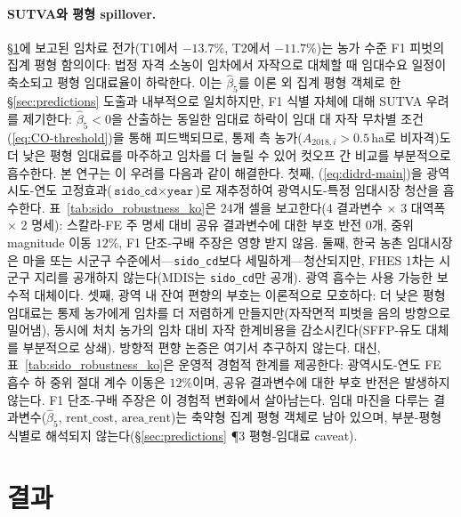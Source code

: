 \documentclass[12pt, a4paper]{article}
\begin{document}
\paragraph{SUTVA와 평형 spillover.} \S\ref{sec:results}에 보고된 임차료 전가(T1에서 $-13.7\%$, T2에서 $-11.7\%$)는 농가 수준 F1 피벗의 집계 평형 함의이다: 법정 자격 소농이 임차에서 자작으로 대체할 때 임대수요 일정이 축소되고 평형 임대료율이 하락한다. 이는 $\hat\beta_5$를 이론 외 집계 평형 객체로 한 §\ref{sec:predictions} 도출과 내부적으로 일치하지만, F1 식별 자체에 대해 SUTVA 우려를 제기한다: $\hat\beta_5 < 0$을 산출하는 동일한 임대료 하락이 임대 대 자작 무차별 조건 (\ref{eq:CO-threshold})을 통해 피드백되므로, 통제 측 농가($A_{2018,i} > 0.5$\,ha로 비자격)도 더 낮은 평형 임대료를 마주하고 임차를 더 늘릴 수 있어 컷오프 간 비교를 부분적으로 흡수한다. 본 연구는 이 우려를 다음과 같이 해결한다. 첫째, (\ref{eq:didrd-main})을 광역시도-연도 고정효과($\texttt{sido\_cd} \times \texttt{year}$)로 재추정하여 광역시도-특정 임대시장 청산을 흡수한다. 표~\ref{tab:sido_robustness_ko}은 24개 셀을 보고한다(4 결과변수 $\times$ 3 대역폭 $\times$ 2 명세): 스칼라-FE 주 명세 대비 공유 결과변수에 대한 부호 반전 0개, 중위 magnitude 이동 $12\%$, F1 단조-구배 주장은 영향 받지 않음. 둘째, 한국 농촌 임대시장은 마을 또는 시군구 수준에서---\texttt{sido\_cd}보다 세밀하게---청산되지만, FHES 1차는 시군구 지리를 공개하지 않는다(MDIS는 \texttt{sido\_cd}만 공개). 광역 흡수는 사용 가능한 보수적 대체이다. 셋째, 광역 내 잔여 편향의 부호는 이론적으로 모호하다: 더 낮은 평형 임대료는 통제 농가에게 임차를 더 저렴하게 만들지만(자작면적 피벗을 음의 방향으로 밀어냄), 동시에 처치 농가의 임차 대비 자작 한계비용을 감소시킨다(SFFP-유도 대체를 부분적으로 상쇄). 방향적 편향 논증은 여기서 추구하지 않는다. 대신, 표~\ref{tab:sido_robustness_ko}은 운영적 경험적 한계를 제공한다: 광역시도-연도 FE 흡수 하 중위 절대 계수 이동은 $12\%$이며, 공유 결과변수에 대한 부호 반전은 발생하지 않는다. F1 단조-구배 주장은 이 경험적 변화에서 살아남는다. 임대 마진을 다루는 결과변수($\hat\beta_5$, $\text{rent\_cost}$, $\text{area\_rent}$)는 축약형 집계 평형 객체로 남아 있으며, 부분-평형 식별로 해석되지 않는다(\S\ref{sec:predictions} ¶3 평형-임대료 caveat).

\section{결과}
\label{sec:results}
\end{document}
